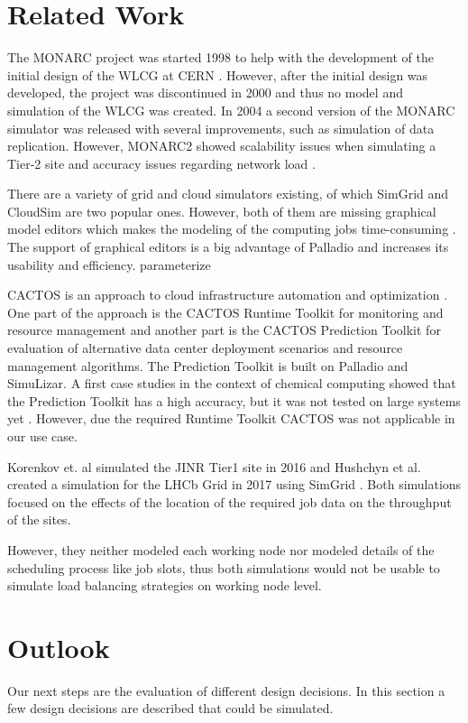 \documentclass[a4paper]{jpconf}
\begin{document}
\section{Related Work}
\label{related}
The MONARC project was started 1998 to help with the development of the initial design of the WLCG at CERN \cite{monarc2000models}.
However, after the initial design was developed, the project was discontinued in 2000 and thus no model and simulation of the WLCG was created. 
In 2004 a second version of the MONARC simulator was released with several improvements, such as simulation of data replication. However, MONARC2 showed scalability issues when simulating a Tier-2 site and accuracy issues regarding network load \cite{1742-6596-331-7-072038}.

There are a variety of grid and cloud simulators existing, of which SimGrid and CloudSim are two popular ones. 
However, both of them are missing graphical model editors which makes the modeling of the computing jobs time-consuming \cite{simgrid}\cite{cloudsim}. The support of graphical editors is a big advantage of Palladio and increases its usability and efficiency. 
 parameterize

CACTOS is an approach to cloud infrastructure automation and optimization \cite{cactos}.
One part of the approach is the CACTOS Runtime Toolkit for monitoring and resource management and another part is the CACTOS Prediction Toolkit for evaluation of alternative data center deployment scenarios and resource management algorithms. The Prediction Toolkit is built on Palladio and SimuLizar.
A first case studies in the context of chemical computing showed that the Prediction Toolkit has a high accuracy, but it was not tested on large systems yet \cite{rapidtesting}. However, due the required Runtime Toolkit CACTOS was not applicable in our use case.

Korenkov et. al simulated the JINR Tier1 site in 2016 \cite{jinr} and Hushchyn et al. created a simulation for the LHCb Grid in 2017 using SimGrid \cite{lhcb}. Both simulations focused on the effects of the location of the required job data on the throughput of the sites.

However, they neither modeled each working node nor modeled details of the scheduling process like job slots, thus both simulations would not be usable to simulate load balancing strategies on working node level.


\section{Outlook}
\label{outlook}
Our next steps are the evaluation of different design decisions. In this section a few design decisions are described that could be simulated.
\end{document}
